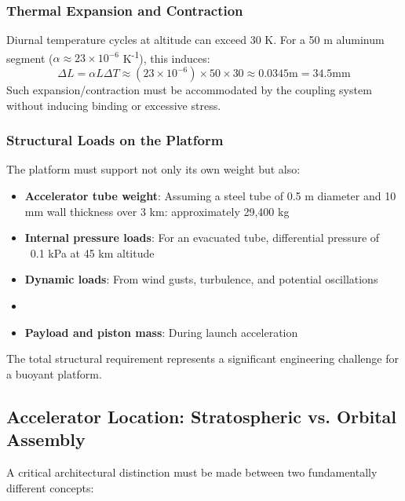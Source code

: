 \documentclass[12pt]{article}
\begin{document}
\begin{itemize}
\subsubsection{Thermal Expansion and Contraction}
Diurnal temperature cycles at altitude can exceed 30 K. For a 50 m aluminum segment ($\alpha \approx 23 \times 10^{-6}$ K\textsuperscript{-1}), this induces:
\begin{equation}
\Delta L = \alpha L \Delta T \approx (23 \times 10^{-6}) \times 50 \times 30 \approx 0.0345  \text{m} = 34.5  \text{mm}
\end{equation}
Such expansion/contraction must be accommodated by the coupling system without inducing binding or excessive stress.

\subsubsection{Structural Loads on the Platform}
The platform must support not only its own weight but also:
\begin{itemize}
    \item \textbf{Accelerator tube weight}: Assuming a steel tube of 0.5 m diameter and 10 mm wall thickness over 3 km: approximately 29,400 kg
    \item \textbf{Internal pressure loads}: For an evacuated tube, differential pressure of ~0.1 kPa at 45 km altitude
    \item \textbf{Dynamic loads}: From wind gusts, turbulence, and potential oscillations
    \item \item \textbf{Payload and piston mass}: During launch acceleration
\end{itemize}
The total structural requirement represents a significant engineering challenge for a buoyant platform.

\subsection{Accelerator Location: Stratospheric vs. Orbital Assembly}
A critical architectural distinction must be made between two fundamentally different concepts:


\end{itemize}
\end{document}
